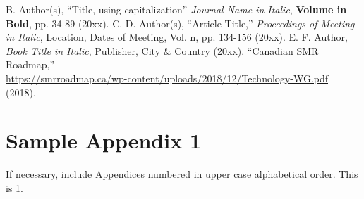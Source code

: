 \documentclass[letterpaper]{mc2023}
\begin{document}
\newif\ifusebibtex
\usebibtexfalse

\ifusebibtex
\setlength{\baselineskip}{12pt}


\else
\setlength{\baselineskip}{12pt}
\begin{thebibliography}{300}
 B. Author(s), ``Title, using capitalization'' \emph{Journal Name in Italic},
  \textbf{Volume in Bold}, pp. 34-89 (20xx).
 C. D. Author(s), ``Article Title,'' \emph{Proceedings of
  Meeting in Italic}, Location, Dates of Meeting, Vol. n, pp. 134-156
  (20xx).
 E. F. Author, \emph{Book Title in Italic}, Publisher, City \&
  Country (20xx).
 ``Canadian SMR Roadmap,'' \\
  \url{https://smrroadmap.ca/wp-content/uploads/2018/12/Technology-WG.pdf} (2018).
\end{thebibliography}
\fi

\appendix
\gdef\thesection{APPENDIX~\Alph{section}}
\section{Sample Appendix 1}
\label{app:a}
If necessary, include Appendices numbered in upper case alphabetical order. This is \ref{app:a}.
\end{document}
